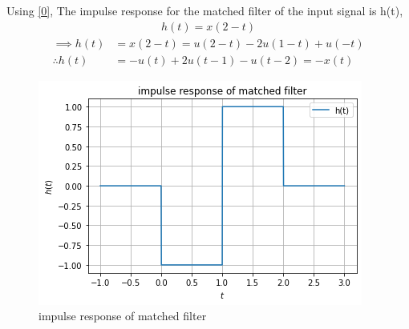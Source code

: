 \documentclass[journal,12pt,twocolumn]{IEEEtran}
\begin{document}
Using \eqref{0}, The impulse response for the matched filter of the input signal is h(t),
\begin{align}
    h(t) = x(2-t)
\end{align}
\begin{align}
    \implies\nonumber h(t) &= x(2-t) = u(2-t)-2u(1-t)+u(-t)\\
\nonumber    \therefore h(t)&= -u(t)+2u(t-1)-u(t-2) = -x(t)
\end{align}
 \begin{figure}[!htp]
\centering
 \includegraphics[width=\columnwidth]{h.png}
 \caption{impulse response of matched filter}
 \end{figure}
 
\end{document}
